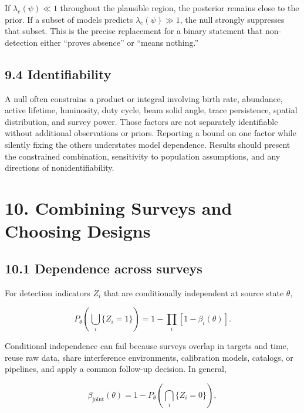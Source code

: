 \documentclass[11pt,a4paper]{article}
\begin{document}
If \(\lambda_e(\psi)\ll1\) throughout the plausible region, the posterior remains close to the prior. If a subset of models predicts \(\lambda_e(\psi)\gg1\), the null strongly suppresses that subset. This is the precise replacement for a binary statement that non-detection either ``proves absence'' or ``means nothing.''

\subsection{9.4 Identifiability}\label{94-identifiability}

A null often constrains a product or integral involving birth rate, abundance, active lifetime, luminosity, duty cycle, beam solid angle, trace persistence, spatial distribution, and survey power. Those factors are not separately identifiable without additional observations or priors. Reporting a bound on one factor while silently fixing the others understates model dependence. Results should present the constrained combination, sensitivity to population assumptions, and any directions of nonidentifiability.

\section{10. Combining Surveys and Choosing Designs}\label{10-combining-surveys-and-choosing-designs}

\subsection{10.1 Dependence across surveys}\label{101-dependence-across-surveys}

For detection indicators \(Z_i\) that are conditionally independent at source state \(\theta\),

\begin{equation}
P_\theta\!\left(\bigcup_i\{Z_i=1\}\right)
=1-\prod_i[1-\beta_i(\theta)].
\end{equation}

Conditional independence can fail because surveys overlap in targets and time, reuse raw data, share interference environments, calibration models, catalogs, or pipelines, and apply a common follow-up decision. In general,

\begin{equation}
\beta_{\mathrm{joint}}(\theta)
=1-P_\theta\!\left(\bigcap_i\{Z_i=0\}\right),
\end{equation}
\end{document}
